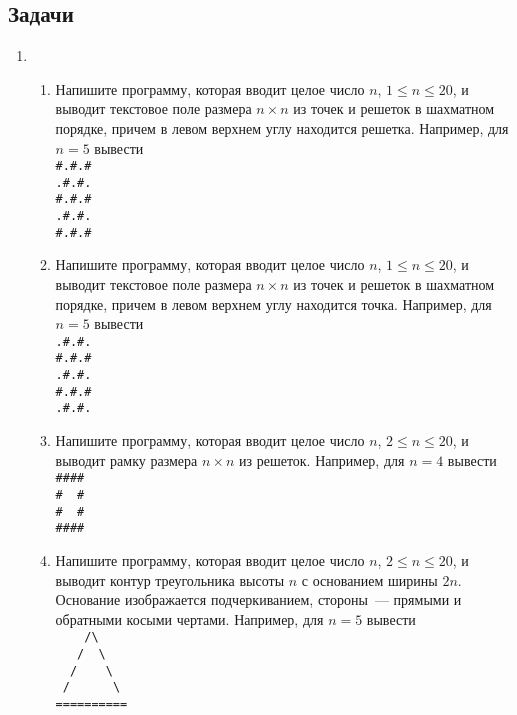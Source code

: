 \documentclass{article}
\begin{document}
\subsection*{Задачи}
\begin{enumerate}[label={}, leftmargin=0pt, itemindent=0pt]
\item
\begin{enumerate}[label=\arabic{enumi}.\arabic*.]
\item
Напишите программу, которая вводит целое число $n$, $1\leqslant n \leqslant 20$, и выводит текстовое поле размера $n\times n$ из точек и решеток в шахматном порядке, причем в левом верхнем углу находится решетка.
Например, для $n=5$ вывести\\
\verb!#.#.#!\\
\verb!.#.#.!\\
\verb!#.#.#!\\
\verb!.#.#.!\\
\verb!#.#.#!
\item 
Напишите программу, которая вводит целое число $n$, $1\leqslant n \leqslant 20$, и выводит текстовое поле размера $n\times n$ из точек и решеток в шахматном порядке, причем в левом верхнем углу находится точка.
Например, для $n=5$ вывести\\
\verb!.#.#.!\\
\verb!#.#.#!\\
\verb!.#.#.!\\
\verb!#.#.#!\\
\verb!.#.#.!
\item 
Напишите программу, которая вводит целое число $n$, $2\leqslant n \leqslant 20$, и выводит рамку размера $n\times n$ из решеток. Например, для $n=4$ вывести\\
\newpage
\verb!#### !\\
\verb!#  # !\\
\verb!#  # !\\
\verb!#### !
\item 
Напишите программу, которая вводит целое число $n$, $2\leqslant n \leqslant 20$, и выводит контур треугольника высоты $n$ с основанием ширины $2n$. Основание изображается подчеркиванием, стороны~--- прямыми и обратными косыми чертами. Например, для $n=5$ вывести
\\
\verb!    /\!\\
\verb!   /  \!\\
\verb!  /    \!\\
\verb! /      \!\\
\verb!==========!
\end{enumerate}
\hrulefill


\end{enumerate}
\end{document}
